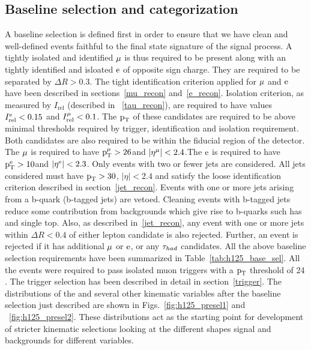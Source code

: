 \subsection{Baseline selection and categorization}
\label{h125_evt_sel_bkg}
A baseline selection is defined first in order to ensure that we have clean and well-defined events faithful to the final state signature of the signal process. A tightly isolated and identified $\mu$ is thus required to be present along with an tightly identified and isloated $\text{e}$ of opposite sign charge. They are required to be separated by $\Delta R > 0.3$. The tight identification criterion applied for $\mu$ and $\text{e}$ have been described in sections~\ref{mu_recon} and~\ref{e_recon}. Isolation criterion, as measured by $I_\text{rel}$ (described in ~\ref{tau_recon}), are required to have values $I_\text{rel}^{\text{e}} < 0.15$ and $I_\text{rel}^{\mu} < 0.1$. The $\text{p}_\text{T}$ of these candidates are required to be above minimal thresholds required by trigger, identification and isolation requirement. Both candidates are also required to be within the fiducial region of the detector. The $\mu$ is required to have $\text{p}_\text{T}^{\mu} > 26$\GeV and $|\eta^{\mu}|<2.4$.The $\text{e}$ is required to have $\text{p}_\text{T}^{\text{e}} > 10$\GeV and $|\eta^{\text{e}}|<2.3$. Only events with two or fewer jets are considered. All jets considered must have $\text{p}_\text{T}>30$\GeV, $|\eta| < 2.4 $ and satisfy the loose identification criterion described in section~\ref{jet_recon}. Events with one or more jets arising from a b-quark (b-tagged jets) are vetoed. Cleaning events with b-tagged jets reduce some contribution from backgrounds which give rise to b-quarks such has \ttb and single top. Also, as described in~\ref{jet_recon}, any event with one or more jets within $\Delta R < 0.4$ of either lepton candidate is also rejected. Further, an event is rejected if it has additional $\mu$ or $\text{e}$, or any $\tau_{had}$ candidates. All the above baseline selection requirements have been summarized in Table~\ref{tab:h125_base_sel}. All the events were required to pass isolated muon triggers with a $\text{p}_\text{T}$ threshold of 24 \GeV. The trigger selection has been described in detail in section~\ref{trigger}. The distributions of the \mcol and several other kinematic variables after the baseline selection just described are shown in Figs.~\ref{fig:h125_presel1} and ~\ref{fig:h125_presel2}. These distributions act as the starting point for development of stricter kinematic selections looking at the different shapes signal and backgrounds for different variables.     


